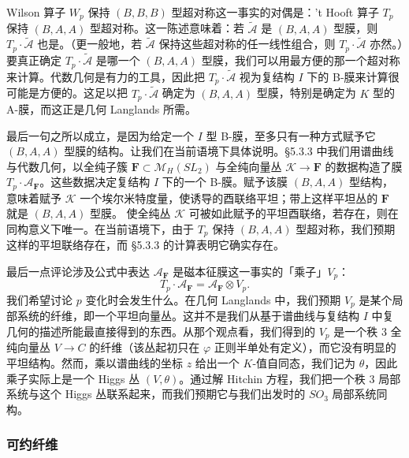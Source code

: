 \documentclass[11pt,a4paper]{article}
\begin{document}
Wilson 算子 $W_p$ 保持 $(B,B,B)$ 型超对称这一事实的对偶是：'t Hooft 算子 $T_p$ 保持 $(B,A,A)$ 型超对称。这一陈述意味着：若 $\widetilde{\mathcal{A}}$ 是 $(B,A,A)$ 型膜，则 $T_p\cdot\widetilde{\mathcal{A}}$ 也是。（更一般地，若 $\widetilde{\mathcal{A}}$ 保持这些超对称的任一线性组合，则 $T_p\cdot\widetilde{\mathcal{A}}$ 亦然。）要真正确定 $T_p\cdot\widetilde{\mathcal{A}}$ 是哪一个 $(B,A,A)$ 型膜，我们可以用最方便的那一个超对称来计算。代数几何是有力的工具，因此把 $T_p\cdot\widetilde{\mathcal{A}}$ 视为复结构 $I$ 下的 B-膜来计算很可能是方便的。这足以把 $T_p\cdot\widetilde{\mathcal{A}}$ 确定为 $(B,A,A)$ 型膜，特别是确定为 $K$ 型的 A-膜，而这正是几何 Langlands 所需。

最后一句之所以成立，是因为给定一个 $I$ 型 B-膜，至多只有一种方式赋予它 $(B,A,A)$ 型膜的结构。让我们在当前语境下具体说明。§5.3.3 中我们用谱曲线与代数几何，以全纯子簇 $\boldsymbol{F}\subset\mathcal{M}_H(SL_2)$ 与全纯向量丛 $\mathcal{K}\to\boldsymbol{F}$ 的数据构造了膜 $T_p\cdot\mathcal{A}_{\boldsymbol{F}}$。这些数据决定复结构 $I$ 下的一个 B-膜。赋予该膜 $(B,A,A)$ 型结构，意味着赋予 $\mathcal{K}$ 一个埃尔米特度量，使诱导的酉联络平坦；带上这样平坦丛的 $\boldsymbol{F}$ 就是 $(B,A,A)$ 型膜。
使全纯丛 $\mathcal{K}$ 可被如此赋予的平坦酉联络，若存在，则在同构意义下唯一。在当前语境下，由于 $T_p$ 保持 $(B,A,A)$ 型超对称，我们预期这样的平坦联络存在，而 §5.3.3 的计算表明它确实存在。

最后一点评论涉及公式中表达 $\mathcal{A}_{\boldsymbol{F}}$ 是磁本征膜这一事实的「乘子」$V_p$：
\begin{equation}\tag{5.29}
T_p\cdot\mathcal{A}_{\boldsymbol{F}}=\mathcal{A}_{\boldsymbol{F}}\otimes V_p.
\end{equation}
我们希望讨论 $p$ 变化时会发生什么。在几何 Langlands 中，我们预期 $V_p$ 是某个局部系统的纤维，即一个平坦向量丛。这并不是我们从基于谱曲线与复结构 $I$ 中复几何的描述所能最直接得到的东西。从那个观点看，我们得到的 $V_p$ 是一个秩 3 全纯向量丛 $V\to C$ 的纤维（该丛起初只在 $\varphi$ 正则半单处有定义），而它没有明显的平坦结构。然而，乘以谱曲线的坐标 $z$ 给出一个 $K$-值自同态，我们记为 $\theta$，因此乘子实际上是一个 Higgs 丛 $(V,\theta)$。通过解 Hitchin 方程，我们把一个秩 3 局部系统与这个 Higgs 丛联系起来，而我们预期它与我们出发时的 $SO_3$ 局部系统同构。

\subsubsection{可约纤维}
\end{document}

